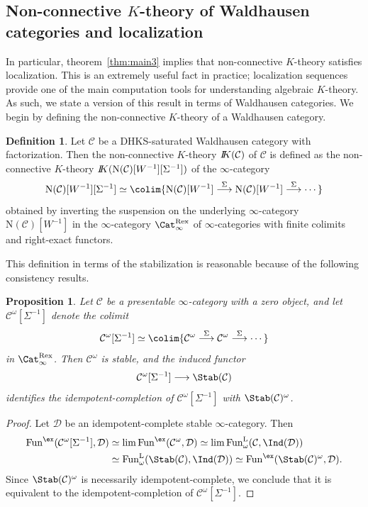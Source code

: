 \documentclass{amsart}
\let\catsymbfont\mathcal
\newcommand{\aC}{{\catsymbfont{C}}}
\newcommand{\aD}{{\catsymbfont{D}}}
\newcommand{\C}{\catsymbfont{C}}
\renewcommand{\L}{\mathrm{L}}
\newcommand{\bbK}{I\mspace{-6.mu}K}
\newcommand{\N}{\mathrm{N}}
\newcommand{\Fun}{\mathrm{Fun}} %
\newcommand{\too}{\longrightarrow}%
\renewcommand{\i}{\infty}
\numberwithin{equation}{section}
\newtheorem{proposition}[equation]{Proposition}
\theoremstyle{definition}
\newtheorem{definition}[equation]{Definition}
\begin{document}
\subsection{Non-connective $K$-theory of Waldhausen categories and localization}
In particular, theorem~\ref{thm:main3} implies that non-connective
$K$-theory satisfies localization.  This is an extremely useful fact
in practice; localization sequences provide one of the main
computation tools for understanding algebraic $K$-theory.  As such, we
state a version of this result in terms of Waldhausen categories.  We
begin by defining the non-connective $K$-theory of a Waldhausen
category.

\begin{definition}\label{def:ncKwald}
Let $\aC$ be a DHKS-saturated Waldhausen category with factorization.
Then the non-connective $K$-theory $\bbK(\aC)$ of $\aC$ is defined as
the non-connective $K$-theory $\bbK(\N(\aC)[W^{-1}][\Sigma^{-1}])$ of
the $\infty$-category 
\[
\N(\aC)[W^{-1}][\Sigma^{-1}]\simeq\colim\{\N(\aC)[W^{-1}]\overset{\Sigma}{\too}\N(\aC)[W^{-1}]\overset{\Sigma}{\too}\cdots\}
\]
obtained by inverting the suspension on the underlying $\i$-category
$\N(\aC)[W^{-1}]$ in the $\infty$-category $\Cat_\infty^\mathrm{Rex}$
of $\infty$-categories with finite colimits and right-exact functors. 
\end{definition}

This definition in terms of the stabilization is reasonable because of
the following consistency results. 

\begin{proposition}\label{prop:stab=Sigma^-1}
Let $\C$ be a presentable $\i$-category with a zero object, and let
$\C^\omega[\Sigma^{-1}]$ denote the colimit 
\[
\C^\omega[\Sigma^{-1}]\simeq\colim\{\C^\omega\overset{\Sigma}{\too}\C^\omega\overset{\Sigma}{\too}\cdots\}
\]
in $\Cat_\infty^\mathrm{Rex}$.
Then $\C^\omega$ is stable, and the induced functor
\[
\C^\omega[\Sigma^{-1}]\too\Stab(\C)
\]
identifies the idempotent-completion of $\C^\omega[\Sigma^{-1}]$ with $\Stab(\C)^\omega$.
\end{proposition}
\begin{proof}
Let $\aD$ be an idempotent-complete stable $\infty$-category.
Then
\begin{align*}
\Fun^{\ex}(\C^\omega[\Sigma^{-1}],\aD)&\simeq\lim\Fun^{\ex}(\C^\omega,\aD)\simeq\lim\Fun^{\L}_\omega(\C,\Ind(\aD))\\
&\simeq\Fun^{\L}_\omega(\Stab(\C),\Ind(\aD))\simeq\Fun^\mathrm{\ex}(\Stab(\C)^\omega,\aD).
\end{align*}
Since $\Stab(\C)^\omega$ is necessarily idempotent-complete, we conclude that it is equivalent to the idempotent-completion of $\C^\omega[\Sigma^{-1}]$.
\end{proof}
\end{document}
